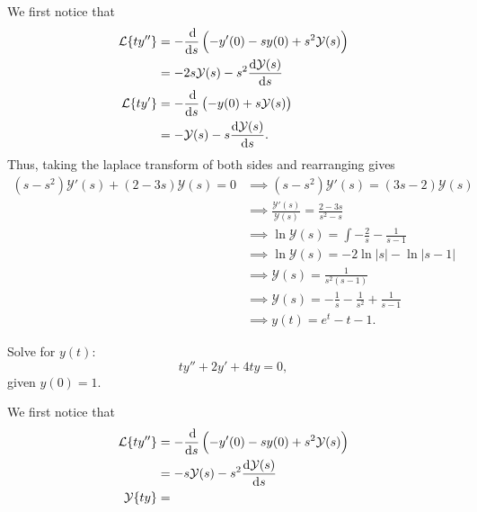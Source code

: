 \begin{soln}
    We first notice that
    \begin{align*}
        \mathcal{L}\{ty''\} &= -\frac{\dif}{\dif s} \left(-y'(0)-sy(0)+s^2\mathcal{Y}(s)\right) \\
                            &= -2s\mathcal{Y}(s)-s^2 \frac{\dif \mathcal{Y}(s)}{\dif s} \\
        \mathcal{L}\{ty'\} &= -\frac{\dif }{\dif s}\left(-y(0)+s\mathcal{Y}(s)\right) \\
                           &= -\mathcal{Y}(s)-s \frac{\dif \mathcal{Y}(s)}{\dif s}.
    \end{align*}
    Thus, taking the laplace transform of both sides and rearranging gives
    \begin{align*}
        (s-s^2)\mathcal{Y}'(s)+(2-3s)\mathcal{Y}(s) = 0 &\implies (s-s^2)\mathcal{Y}'(s) = (3s-2)\mathcal{Y}(s) \\
                                                        &\implies \frac{\mathcal{Y}'(s)}{\mathcal{Y}(s)} = \frac{2-3s}{s^2-s} \\
                                                        &\implies \ln \mathcal{Y}(s) = \int -\frac{2}{s}-\frac{1}{s-1} \\
                                                        &\implies \ln \mathcal{Y}(s) = -2\ln | s | - \ln | s - 1 | \\
                                                        &\implies \mathcal{Y}(s)  = \frac{1}{s^2(s-1)} \\
                                                        &\implies \mathcal{Y}(s) = -\frac{1}{s}-\frac{1}{s^2}+\frac{1}{s-1} \\
                                                        &\implies y(t) = e^{t}-t-1.
    \end{align*}
\end{soln}

\begin{example}
    Solve for $y(t)$:
    $$ty''+2y'+4ty=0,$$
    given $y(0) = 1$.
\end{example}
\begin{soln}
    We first notice that
    \begin{align*}
        \mathcal{L}\{ty''\} &= -\frac{\dif}{\dif s} \left(-y'(0)-sy(0)+s^2\mathcal{Y}(s)\right) \\
                            &= -s\mathcal{Y}(s)-s^2 \frac{\dif \mathcal{Y}(s)}{\dif s} \\
        \mathcal{Y}\{ty\} &= 
    \end{align*}
\end{soln}
